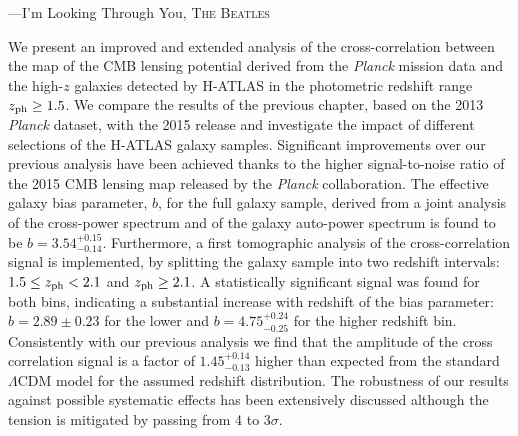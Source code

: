 \setlength{\epigraphwidth}{.55\textwidth}
\begin{epigraphs}
%
 {---I'm Looking Through You, \textsc{The Beatles}}
 \end{epigraphs}

We present an improved and extended analysis of the cross-correlation between the map of the \gls{CMB} lensing potential derived from the \emph{Planck} mission data and the high-$z$ galaxies detected by H-ATLAS in the photometric redshift range $z_{\rm{ph}} \ge 1.5$. We compare the results of the previous chapter, based on the 2013 \textit{Planck} dataset, with the 2015 release and investigate the impact of different selections of the H-ATLAS  galaxy samples. Significant improvements over our previous analysis have been achieved thanks to the higher signal-to-noise ratio of the 2015 CMB lensing map released by the \textit{Planck} collaboration. The effective galaxy bias parameter, $b$, for the full galaxy sample, derived from a joint analysis of the cross-power spectrum and of the galaxy auto-power spectrum  is found to be $b = 3.54^{+0.15}_{-0.14}$. Furthermore, a first tomographic analysis of the cross-correlation signal is implemented, by splitting the galaxy sample into two redshift intervals: $1.5 \le z_{\rm{ph}} < 2.1$ and $z_{\rm{ph}}\ge 2.1$. A statistically significant signal was found for both bins, indicating a substantial increase with redshift of the bias parameter: $b=2.89\pm0.23$ for the lower and $b=4.75^{+0.24}_{-0.25}$ for the higher redshift bin. Consistently with our previous analysis we find that the amplitude of the cross correlation signal is a factor of $1.45^{+0.14}_{-0.13}$ higher than expected from the standard $\Lambda$CDM model  for the assumed redshift distribution. The robustness of our results against possible systematic effects has been extensively discussed although the tension is mitigated by passing from 4 to 3$\sigma$.


